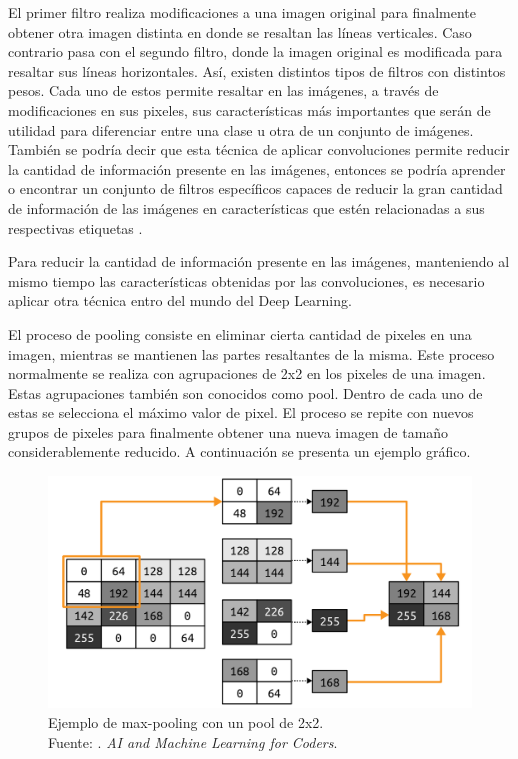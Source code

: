 El primer filtro realiza modificaciones a una imagen original para finalmente obtener otra imagen distinta en donde se resaltan las líneas verticales. Caso contrario pasa con el segundo filtro, donde la imagen original es modificada para resaltar sus líneas horizontales. Así, existen distintos tipos de filtros con distintos pesos. Cada uno de estos permite resaltar en las imágenes, a través de modificaciones en sus pixeles, sus características más importantes que serán de utilidad para diferenciar entre una clase u otra de un conjunto de imágenes. También se podría decir que esta técnica de aplicar convoluciones permite reducir la cantidad de información presente en las imágenes, entonces se podría aprender o encontrar un conjunto de filtros específicos capaces de reducir la gran cantidad de información de las imágenes en características que estén relacionadas a sus respectivas etiquetas \parencite{bk_moroney2020aiandml}.

Para reducir la cantidad de información presente en las imágenes, manteniendo al mismo tiempo las características obtenidas por las convoluciones, es necesario aplicar otra técnica entro del mundo del Deep Learning.

El proceso de pooling consiste en eliminar cierta cantidad de pixeles en una imagen, mientras se mantienen las partes resaltantes de la misma. Este proceso normalmente se realiza con agrupaciones de 2x2 en los pixeles de una imagen. Estas agrupaciones también son conocidos como pool. Dentro de cada uno de estas se selecciona el máximo valor de pixel. El proceso se repite con nuevos grupos de pixeles para finalmente obtener una nueva imagen de tamaño considerablemente reducido. \parencite{bk_moroney2020aiandml} A continuación se presenta un ejemplo gráfico.

\begin{figure}[H]
	\begin{center}
		\includegraphics[width=1.00\textwidth]{2/figures/cnn_pool_examp.png}
		\caption[Ejemplo de max-pooling con un pool de 2x2]{Ejemplo de max-pooling con un pool de 2x2. \\
		Fuente: \cite{bk_moroney2020aiandml}. \textit{AI and Machine Learning for Coders}.}
		\label{2:fig204}
	\end{center}
\end{figure}

